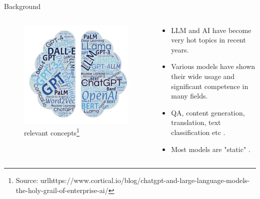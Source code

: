 \documentclass[t]{beamer}
\begin{document}
\begin{frame}{Background}
  \begin{columns}
    \begin{column}{0.4\textwidth}
        \begin{figure}
            \centering
            \includegraphics[width=\textwidth]{llm1.png}
            \caption{relevant concepts\footnote{Source: url{https://www.cortical.io/blog/chatgpt-and-large-language-models-the-holy-grail-of-enterprise-ai/}}}
            \label{fig:llm1}
        \end{figure}
    \end{column}
    \begin{column}{0.5\textwidth}
        \begin{itemize}
            \item LLM and AI have become very hot topics in recent years.
            \item Various models have shown their wide usage and significant competence in many fields.
            \item QA, content generation, translation, text classification etc \cite{Liu23}.
            \item Most models are "static" \cite{Gupta23}.
        \end{itemize}
    \end{column}
\end{columns}
\end{frame}
\end{document}
